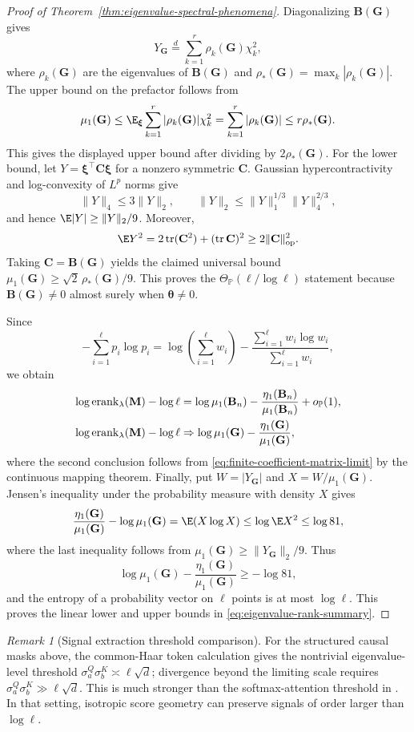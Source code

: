 \documentclass{article}
\newcommand{\Prob}{\mathbb{P}}
\newcommand{\op}{\operatorname{op}}
\newcommand{\weak}{\Rightarrow}
\newcommand{\bB}{\mathbf{B}}
\newcommand{\bC}{\mathbf{C}}
\newcommand{\bM}{\mathbf{M}}
\newcommand{\bG}{\mathbf{G}}
\theoremstyle{definition}
\theoremstyle{remark}
\newtheorem{remark}[theorem]{Remark}
\begin{document}
\begin{proof}[Proof of Theorem~\ref{thm:eigenvalue-spectral-phenomena}]
Diagonalizing $\bB(\bG)$ gives
\[
    Y_{\bG}
    \stackrel{d}{=}
    \sum_{k=1}^r\rho_k(\bG)\chi_k^2,
\]
where $\rho_k(\bG)$ are the eigenvalues of $\bB(\bG)$ and
$\rho_*(\bG)=\max_k|\rho_k(\bG)|$.
The upper bound on the prefactor follows from
\[
    \mu_1(\bG)
    \leq
    \E_{\boldsymbol{\xi}}\sum_{k=1}^r|\rho_k(\bG)|\chi_k^2
    =
    \sum_{k=1}^r|\rho_k(\bG)|
    \leq
    r\rho_*(\bG).
\]
This gives the displayed upper bound after dividing by $2\rho_*(\bG)$.  For
the lower bound, let $Y=\boldsymbol{\xi}^\top\bC\boldsymbol{\xi}$ for a
nonzero symmetric $\bC$.  Gaussian hypercontractivity and log-convexity of
$L^p$ norms give
\[
    \|Y\|_4\leq3\|Y\|_2,
    \qquad
    \|Y\|_2\leq\|Y\|_1^{1/3}\|Y\|_4^{2/3},
\]
and hence $\E|Y|\geq\|Y\|_2/9$.  Moreover,
\[
    \E Y^2
    =2\operatorname{tr}(\bC^2)+(\operatorname{tr}\bC)^2
    \geq2\|\bC\|_{\op}^2.
\]
Taking $\bC=\bB(\bG)$ yields the claimed universal bound
$\mu_1(\bG)\geq \sqrt2\,\rho_*(\bG)/9$.  This proves
the $\Theta_{\Prob}(\ell/\log\ell)$ statement because $\bB(\bG)\neq0$ almost
surely when $\boldsymbol{\theta}\neq0$.

Since
\[
    -\sum_{i=1}^{\ell}p_i\log p_i
    =
    \log\left(\sum_{i=1}^{\ell}w_i\right)
    -
    \frac{\sum_{i=1}^{\ell}w_i\log w_i}
    {\sum_{i=1}^{\ell}w_i},
\]
we obtain
\begin{align}
    \log\operatorname{erank}_{\lambda}(\bM)-\log\ell
    &=
    \log\mu_1(\bB_n)
    -\frac{\eta_1(\bB_n)}{\mu_1(\bB_n)}
    +o_{\Prob}(1),
    \notag\\
    \log\operatorname{erank}_{\lambda}(\bM)-\log\ell
    &\weak
    \log\mu_1(\bG)-\frac{\eta_1(\bG)}{\mu_1(\bG)},
    \label{eq:eigenvalue-entropy-limit}
\end{align}
where the second conclusion follows from
\eqref{eq:finite-coefficient-matrix-limit} by the continuous mapping theorem.
Finally, put $W=|Y_{\bG}|$ and $X=W/\mu_1(\bG)$.  Jensen's inequality under
the probability measure with density $X$ gives
\[
    \frac{\eta_1(\bG)}{\mu_1(\bG)}-\log\mu_1(\bG)
    =\E(X\log X)
    \leq\log\E X^2
    \leq\log81,
\]
where the last inequality follows from
$\mu_1(\bG)\geq\|Y_{\bG}\|_2/9$.  Thus
\[
    \log\mu_1(\bG)
    -
    \frac{\eta_1(\bG)}{\mu_1(\bG)}
    \geq
    -\log81,
\]
and the entropy of a probability vector on $\ell$ points is at most $\log\ell$.
This proves the linear lower and upper bounds in
\eqref{eq:eigenvalue-rank-summary}.
\end{proof}

\begin{remark}[Signal extraction threshold comparison]
For the structured causal masks above, the common-Haar token calculation gives
the nontrivial eigenvalue-level threshold
$\sigma^Q_a\sigma^K_b\asymp\ell\sqrt d$; divergence beyond the limiting scale
requires $\sigma^Q_a\sigma^K_b\gg\ell\sqrt d$.  This is much stronger than the
softmax-attention threshold in \citet{li:2026spectral}.  In that setting,
isotropic score geometry can preserve signals of order larger than $\log \ell$.
\label{rem:threshold-comparison}
\end{remark}
\end{document}
